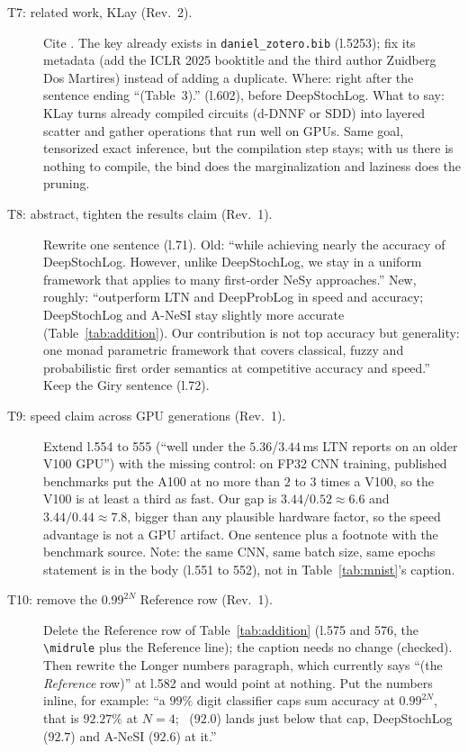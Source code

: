\documentclass[anon]{../../journal-templates/NeSy26/nesy2026} %
\begin{document}
\begin{description}
\item[T7: related work, KLay (Rev.~2).]
Cite \citet{maeneKLAYACCELERATINGARITHMETIC2025}. The key already exists in
\texttt{daniel\_zotero.bib} (l.5253); fix its metadata (add the ICLR 2025
booktitle and the third author Zuidberg Dos Martires) instead of adding a
duplicate. Where: right after the sentence ending ``(Table~3).'' (l.602),
before DeepStochLog. What to say: KLay turns already compiled circuits
(d-DNNF or SDD) into layered scatter and gather operations that run well on
GPUs. Same goal, tensorized exact inference, but the compilation step
stays; with us there is nothing to compile, the bind does the
marginalization and laziness does the pruning.

\item[T8: abstract, tighten the results claim (Rev.~1).]
Rewrite one sentence (l.71). Old: ``while achieving nearly the accuracy of
DeepStochLog. However, unlike DeepStochLog, we stay in a uniform framework
that applies to many first-order NeSy approaches.'' New, roughly:
``outperform LTN and DeepProbLog in speed and accuracy; DeepStochLog and
A-NeSI stay slightly more accurate (Table~\ref{tab:addition}). Our
contribution is not top accuracy but generality: one monad parametric
framework that covers classical, fuzzy and probabilistic first order
semantics at competitive accuracy and speed.'' Keep the Giry sentence
(l.72).

\item[T9: speed claim across GPU generations (Rev.~1).]
Extend l.554 to 555 (``well under the $5.36$/$3.44$\,ms LTN reports on an
older V100 GPU'') with the missing control: on FP32 CNN training, published
benchmarks put the A100 at no more than $2$ to $3$ times a V100, so the
V100 is at least a third as fast. Our gap is $3.44/0.52 \approx 6.6$ and
$3.44/0.44 \approx 7.8$, bigger than any plausible hardware factor, so the
speed advantage is not a GPU artifact. One sentence plus a footnote with
the benchmark source. Note: the same CNN, same batch size, same epochs
statement is in the body (l.551 to 552), not in Table~\ref{tab:mnist}'s
caption.

\item[T10: remove the $0.99^{2N}$ Reference row (Rev.~1).]
Delete the Reference row of Table~\ref{tab:addition} (l.575 and 576, the
\verb|\midrule| plus the Reference line); the caption needs no change
(checked). Then rewrite the Longer numbers paragraph, which currently says
``(the \emph{Reference} row)'' at l.582 and would point at nothing. Put the
numbers inline, for example: ``a $99\%$ digit classifier caps sum accuracy
at $0.99^{2N}$, that is $92.27\%$ at $N{=}4$; \nesycattorch\ ($92.0$) lands
just below that cap, DeepStochLog ($92.7$) and A-NeSI ($92.6$) at it.''


\end{description}
\end{document}
